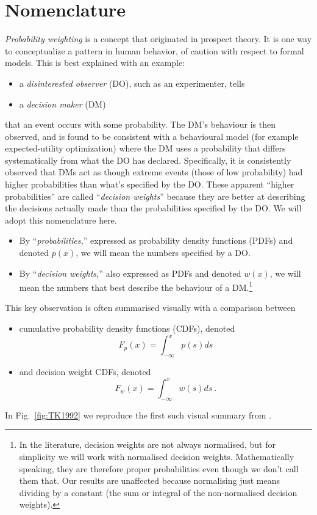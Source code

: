 \documentclass[a4paper, 12pt]{article}
\newcommand{\bi}{\begin{itemize}}
\newcommand{\ei}{\end{itemize}}
\newcommand{\fref}[1]{Fig.~\ref{fig:#1}}
\newcommand{\be}{\begin{equation}}
\newcommand{\ee}{\end{equation}}
\begin{document}
\section{Nomenclature}
{\it Probability weighting} is a concept that originated in prospect theory. It is one way to conceptualize a pattern in human behavior, of caution with respect to formal models.
This is best explained with an example:
\bi
	\item a \textit{disinterested observer} (DO), such as an experimenter, tells
	\item a \textit{decision maker} (DM) 
\ei
that an event occurs with some probability. The DM's behaviour is then observed, and is found to be consistent with a behavioural model (for example expected-utility optimization) where the DM uses a probability that differs systematically from what the DO has declared.
% 
Specifically, it is consistently observed that DMs act as though extreme events (those of low probability) had higher probabilities than what's specified by the DO. These apparent ``higher probabilities'' are called ``{\it decision weights}'' because they are better at describing the decisions actually made than the probabilities specified by the DO. We will adopt this nomenclature here. 
\bi
	\item By ``\textit{probabilities,}'' expressed as probability density functions (PDFs) and denoted $p(x)$, we will mean the numbers specified by a DO.
	\item By ``\textit{decision weights,}'' also expressed as PDFs and denoted $w(x)$, we will mean the numbers that best describe the behaviour of a DM.\footnote{In the literature, decision weights are not always normalised, but for simplicity we will work with normalised decision weights. Mathematically speaking, they are therefore proper probabilities even though we don't call them that. Our results are unaffected because normalising just means dividing by a constant (the sum or integral of the non-normalised decision weights).}
\ei

This key observation is often summarised visually with a comparison between 
\bi
	\item cumulative probability density functions (CDFs), denoted 
% 
\be
	F_p(x)=\int_{-\infty}^x p(s) ds
\ee
%
	\item and decision weight CDFs, denoted
% 
\be
	F_w(x)=\int_{-\infty}^x w(s) ds ~.
\ee
\ei
In \fref{TK1992} we reproduce the first such visual summary from \cite[310]{TverskyKahneman1992}.
\end{document}
